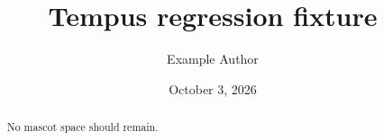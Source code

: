 \documentclass{tempusreport}
\title{Tempus regression fixture}
\author{Example Author}\date{October 3, 2026}
\begin{document}
\maketitle
\begin{abstract}No mascot space should remain.\end{abstract}
\end{document}
